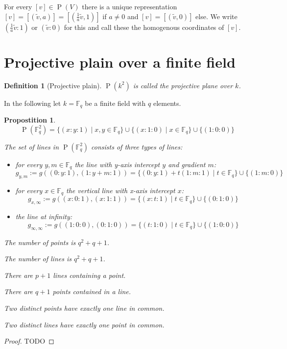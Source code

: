 \documentclass{article}
\newtheorem{definition}{Definition}
\newtheorem{propostition}{Propostition}
\begin{document}
	For every $[v]\in \operatorname{P}(V)$ there is a unique representation $[v]=[(\tilde{v}, a)]=[(\frac{1}{a}\tilde{v},1)]$ if $a\neq 0$ and $[v]=[(\tilde{v}, 0)]$ else. We write $(\frac{1}{a}\tilde{v}:1)$ or $(\tilde{v}:0)$ for this and call these the homogenous coordinates of $[v]$. 

	\section{Projective plain over a finite field}
	\begin{definition}[Projective plain]
		$\operatorname{P}(k^2)$ is called the projective plane over $k$.
	\end{definition}
	In the following let $k=\mathbb{F}_q$ be a finite field with $q$ elements.
	
	\begin{propostition}
		$$\operatorname{P}(\mathbb{F}_q^2)=\{(x:y:1)\mid x, y \in \mathbb{F}_q\}\cup \{(x:1:0)\mid x \in \mathbb{F}_q\}\cup \{(1:0:0)\}$$
	
		The set of lines in $\operatorname{P}(\mathbb{F}_q^2)$ consists of three types of lines:
		\begin{itemize}
			\item for every $y,m\in \mathbb{F}_q$ the line with y-axis intercept $y$ and gradient $m$: $$g_{y,m}:=g((0:y:1), (1:y+m:1))=\{(0:y:1)+ t(1:m:1)\mid t\in \mathbb{F}_q\}\cup \{(1:m:0)\}$$
			\item for every $x\in \mathbb{F}_q$ the vertical line with x-axis intercept $x$: $$g_{x,\infty}:=g((x:0:1),(x:1:1))=\{(x:t:1)\mid t\in \mathbb{F}_q\}\cup \{(0:1:0)\}$$
			\item the line at infinity:
			$$g_{\infty, \infty}:=g((1:0:0),(0:1:0))=\{(t:1:0)\mid t\in \mathbb{F}_q\}\cup \{(1:0:0)\}$$
		\end{itemize}
		
		The number of points is $q^2 +q+1$. 
		
		The number of lines is $q^2 +q+1$. 
		
		There are $p+1$ lines containing a point.
		
		There are $q + 1$ points contained in a line.
		
		Two distinct points have exactly one line in common.
		
		Two distinct lines have exactly one point in common.
	\end{propostition}
	\begin{proof}
		TODO
	\end{proof}
	
\end{document}

